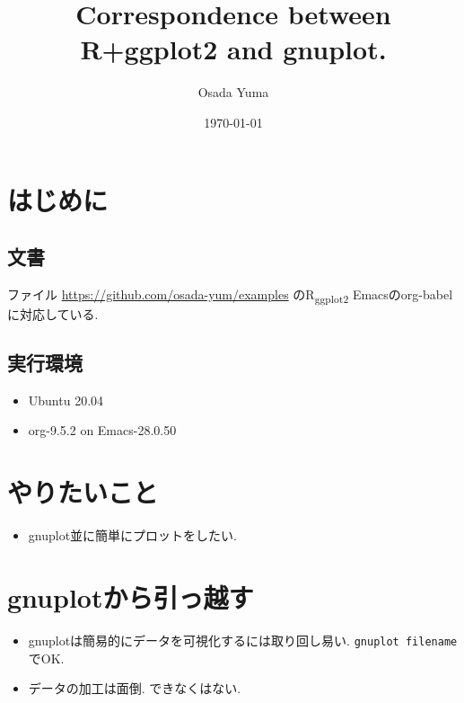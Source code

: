 \documentclass[lualatex,a4paper,12pt,report,ja=standard]{bxjsarticle}
\author{Osada Yuma}
\date{\today}
\title{Correspondence between R+ggplot2 and gnuplot.}
\begin{document}
\maketitle
\tableofcontents

\section{はじめに}
\label{sec:org789026b}
\subsection{文書}
\label{sec:orgd114d23}
ファイル
\url{https://github.com/osada-yum/examples} のR\textsubscript{ggplot2}
Emacsのorg-babelに対応している.
\subsection{実行環境}
\label{sec:org848ad7a}
\begin{itemize}
\item Ubuntu 20.04
\item org-9.5.2 on Emacs-28.0.50
\end{itemize}
\section{やりたいこと}
\label{sec:orgd7c7dc3}
\begin{itemize}
\item gnuplot並に簡単にプロットをしたい.
\end{itemize}
\section{gnuplotから引っ越す}
\label{sec:org1ba8283}
\begin{itemize}
\item gnuplotは簡易的にデータを可視化するには取り回し易い.
\texttt{gnuplot filename} でOK.
\item データの加工は面倒.
できなくはない.
\end{itemize}
\end{document}
